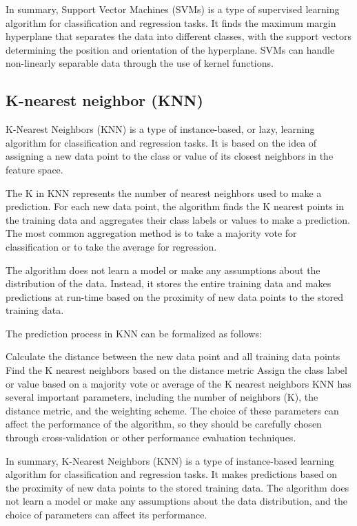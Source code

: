 \documentclass[12pt, a4paper, oneside]{article}
\begin{document}
In summary, Support Vector Machines (SVMs) is a type of supervised learning algorithm for classification and regression tasks. It finds the maximum margin hyperplane that separates the data into different classes, with the support vectors determining the position and orientation of the hyperplane. SVMs can handle non-linearly separable data through the use of kernel functions.


\subsection{ K-nearest neighbor (KNN) }
K-Nearest Neighbors (KNN) is a type of instance-based, or lazy, learning algorithm for classification and regression tasks. It is based on the idea of assigning a new data point to the class or value of its closest neighbors in the feature space.

The K in KNN represents the number of nearest neighbors used to make a prediction. For each new data point, the algorithm finds the K nearest points in the training data and aggregates their class labels or values to make a prediction. The most common aggregation method is to take a majority vote for classification or to take the average for regression.

The algorithm does not learn a model or make any assumptions about the distribution of the data. Instead, it stores the entire training data and makes predictions at run-time based on the proximity of new data points to the stored training data.

The prediction process in KNN can be formalized as follows:

Calculate the distance between the new data point and all training data points
Find the K nearest neighbors based on the distance metric
Assign the class label or value based on a majority vote or average of the K nearest neighbors
KNN has several important parameters, including the number of neighbors (K), the distance metric, and the weighting scheme. The choice of these parameters can affect the performance of the algorithm, so they should be carefully chosen through cross-validation or other performance evaluation techniques.

In summary, K-Nearest Neighbors (KNN) is a type of instance-based learning algorithm for classification and regression tasks. It makes predictions based on the proximity of new data points to the stored training data. The algorithm does not learn a model or make any assumptions about the data distribution, and the choice of parameters can affect its performance.
\end{document}
